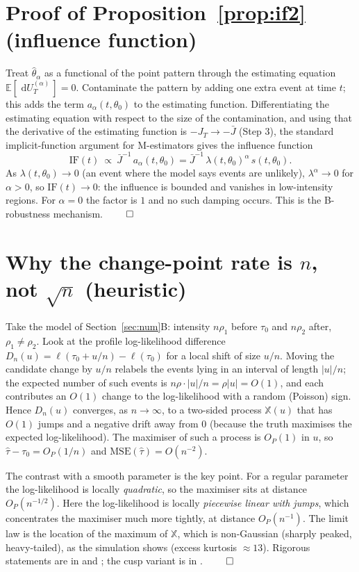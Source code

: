 \documentclass[smallextended,natbib]{svjour3}
\newcommand{\dd}{\,\mathrm{d}}
\newcommand{\E}{\mathbb{E}}
\begin{document}
\section{Proof of Proposition~\ref{prop:if2} (influence function)}
\label{app:if}
Treat $\hat\theta_\alpha$ as a functional of the point pattern through the
estimating equation $\E[\,\dd U_T^{(\alpha)}\,]=0$. Contaminate the pattern by
adding one extra event at time $t$; this adds the term $a_\alpha(t,\theta_0)$ to
the estimating function. Differentiating the estimating equation with respect to
the size of the contamination, and using that the derivative of the estimating
function is $-J_T\to-\bar J$ (Step 3), the standard implicit-function argument for
M-estimators gives the influence function
\[
\mathrm{IF}(t)\ \propto\ \bar J^{-1}\,a_\alpha(t,\theta_0)
=\bar J^{-1}\,\lambda(t,\theta_0)^{\alpha}\,s(t,\theta_0).
\]
As $\lambda(t,\theta_0)\to0$ (an event where the model says events are unlikely),
$\lambda^{\alpha}\to0$ for $\alpha>0$, so $\mathrm{IF}(t)\to0$: the influence is
bounded and vanishes in low-intensity regions. For $\alpha=0$ the factor is $1$ and
no such damping occurs. This is the B-robustness mechanism. $\qed$

\section{Why the change-point rate is $n$, not $\sqrt n$ (heuristic)}
\label{app:cp}
Take the model of Section~\ref{sec:num}B: intensity $n\rho_1$ before $\tau_0$ and
$n\rho_2$ after, $\rho_1\neq\rho_2$. Look at the profile log-likelihood difference
$D_n(u)=\ell(\tau_0+u/n)-\ell(\tau_0)$ for a local shift of size $u/n$. Moving the
candidate change by $u/n$ relabels the events lying in an interval of length
$|u|/n$; the expected number of such events is $n\rho\cdot|u|/n=\rho|u|=O(1)$, and
each contributes an $O(1)$ change to the log-likelihood with a random (Poisson)
sign. Hence $D_n(u)$ converges, as $n\to\infty$, to a two-sided process
$\mathbb X(u)$ that has $O(1)$ jumps and a negative drift away from $0$ (because the
truth maximises the expected log-likelihood). The maximiser of such a process is
$O_P(1)$ in $u$, so $\hat\tau-\tau_0=O_P(1/n)$ and $\mathrm{MSE}(\hat\tau)=O(n^{-2})$.

The contrast with a smooth parameter is the key point. For a regular parameter the
log-likelihood is locally \emph{quadratic}, so the maximiser sits at distance
$O_P(n^{-1/2})$. Here the log-likelihood is locally \emph{piecewise linear with
jumps}, which concentrates the maximiser much more tightly, at distance
$O_P(n^{-1})$. The limit law is the location of the maximum of $\mathbb X$, which is
non-Gaussian (sharply peaked, heavy-tailed), as the simulation shows (excess
kurtosis $\approx13$). Rigorous statements are in \citet{kutoyants1998} and
\citet{ih1981}; the cusp variant is in \citet{dachian2003}. $\qed$
\end{document}
